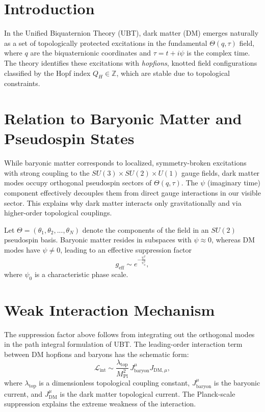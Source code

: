 
\section{Introduction}
In the Unified Biquaternion Theory (UBT), dark matter (DM) emerges naturally as a set of topologically protected excitations in the fundamental $\Theta(q,\tau)$ field, where $q$ are the biquaternionic coordinates and $\tau = t + i\psi$ is the complex time. The theory identifies these excitations with \emph{hopfions}, knotted field configurations classified by the Hopf index $Q_H \in \mathbb{Z}$, which are stable due to topological constraints.

\section{Relation to Baryonic Matter and Pseudospin States}
While baryonic matter corresponds to localized, symmetry-broken excitations with strong coupling to the $SU(3) \times SU(2) \times U(1)$ gauge fields, dark matter modes occupy orthogonal pseudospin sectors of $\Theta(q,\tau)$.
The $\psi$ (imaginary time) component effectively decouples them from direct gauge interactions in our visible sector. This explains why dark matter interacts only gravitationally and via higher-order topological couplings.

Let $\Theta = (\theta_1, \theta_2, ..., \theta_N)$ denote the components of the field in an $SU(2)$ pseudospin basis. Baryonic matter resides in subspaces with $\psi \approx 0$, whereas DM modes have $\psi \neq 0$, leading to an effective suppression factor
\begin{equation}
g_{\mathrm{eff}} \sim e^{-\frac{\psi^2}{\psi_0^2}},
\end{equation}
where $\psi_0$ is a characteristic phase scale.

\section{Weak Interaction Mechanism}
The suppression factor above follows from integrating out the orthogonal modes in the path integral formulation of UBT. The leading-order interaction term between DM hopfions and baryons has the schematic form:
\begin{equation}
\mathcal{L}_{\mathrm{int}} \sim \frac{\lambda_{\mathrm{top}}}{M_{\mathrm{Pl}}^2} \, J_{\mathrm{baryon}}^\mu J_{\mathrm{DM},\mu},
\end{equation}
where $\lambda_{\mathrm{top}}$ is a dimensionless topological coupling constant, $J_{\mathrm{baryon}}^\mu$ is the baryonic current, and $J_{\mathrm{DM}}^\mu$ is the dark matter topological current. The Planck-scale suppression explains the extreme weakness of the interaction.

